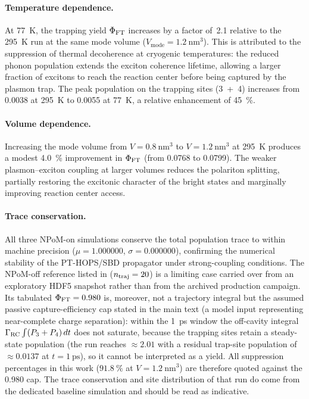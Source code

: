 \documentclass[11pt,a4paper]{article}
\begin{document}
\paragraph{Temperature dependence.} \label{SI-sec:cryo} At \qty{77}{\kelvin}, the trapping yield $\Phi_{\rm FT}$ increases by a factor of~2.1 relative to the \qty{295}{\kelvin} run at the same mode volume ($V_{\mathrm{mode}} = \qty{1.2}{\nm\cubed}$). This is attributed to the suppression of thermal decoherence at cryogenic temperatures: the reduced phonon population extends the exciton coherence lifetime, allowing a larger fraction of excitons to reach the reaction center before being captured by the plasmon trap. The peak population on the trapping sites (3~+~4) increases from \num{0.0038} at \qty{295}{\kelvin} to \num{0.0055} at \qty{77}{\kelvin}, a relative enhancement of \qty{45}{\percent}.

\paragraph{Volume dependence.} Increasing the mode volume from $V = \qty{0.8}{\nm\cubed}$ to $V = \qty{1.2}{\nm\cubed}$ at \qty{295}{\kelvin} produces a modest \qty{4.0}{\percent} improvement in $\Phi_{\rm FT}$ (from \num{0.0768} to \num{0.0799}). The weaker plasmon--exciton coupling at larger volumes reduces the polariton splitting, partially restoring the excitonic character of the bright states and marginally improving reaction center access.

\paragraph{Trace conservation.} All three NPoM-on simulations conserve the total population trace to within machine precision ($\mu =\num{1.000000}$, $\sigma =\num{0.000000}$), confirming the numerical stability of the PT-HOPS/SBD propagator under strong-coupling conditions. The NPoM-off reference listed in  ($n_{\rm traj} = 20$) is a limiting case carried over from an exploratory HDF5 snapshot rather than from the archived production campaign. Its tabulated $\Phi_{\rm FT} =\num{0.980}$ is, moreover, not a trajectory integral but the assumed passive capture-efficiency cap stated in the main text (a model input representing near-complete charge separation): within the \qty{1}{\ps} window the off-cavity integral $\Gamma_{\rm RC}\int (P_3+P_4)\,dt$ does not saturate, because the trapping sites retain a steady-state population (the run reaches $\approx 2.01$ with a residual trap-site population of $\approx\num{0.0137}$ at $t = \qty{1}{\ps}$), so it cannot be interpreted as a yield. All suppression percentages in this work ($\qty{91.8}{\percent}$ at $V = \qty{1.2}{\nm\cubed}$) are therefore quoted against the \num{0.980} cap. The trace conservation and site distribution of that run do come from the dedicated baseline simulation and should be read as indicative.
\end{document}
